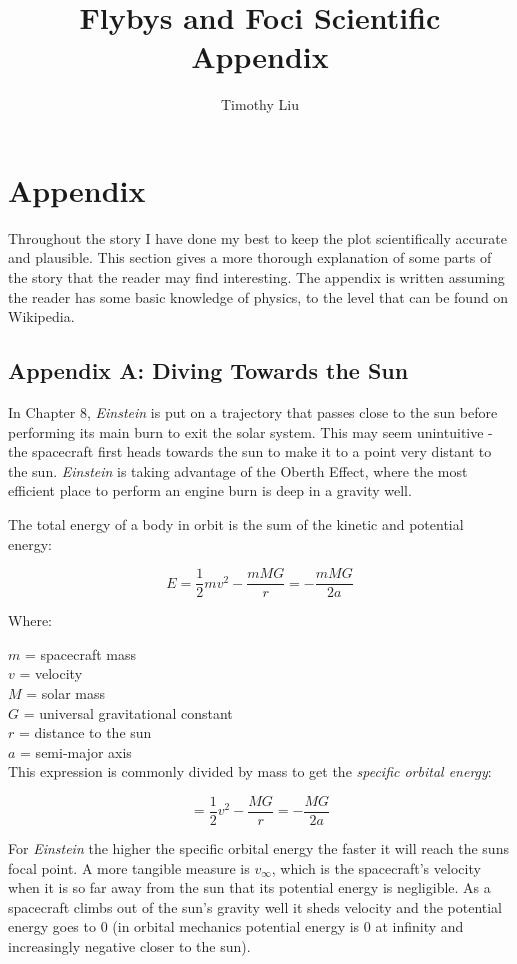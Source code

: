 \documentclass[12pt]{article} %
\title{Flybys and Foci Scientific Appendix}
\author{Timothy Liu}
\begin{document}
\maketitle

\section{Appendix}
Throughout the story I have done my best to keep the plot scientifically accurate and plausible. This section gives a more thorough explanation of some parts of the story that the reader may find interesting. The appendix is written assuming the reader has some basic knowledge of physics, to the level that can be found on Wikipedia.

\subsection{Appendix A: Diving Towards the Sun}


In Chapter 8, \textit{Einstein} is put on a trajectory that passes close to the sun before performing its main burn to exit the solar system. This may seem unintuitive - the spacecraft first heads towards the sun to make it to a point very distant to the sun. \textit{Einstein} is taking advantage of the Oberth Effect, where the most efficient place to perform an engine burn is deep in a gravity well.

The total energy of a body in orbit is the sum of the kinetic and potential energy:

$$ E = \frac{1}{2} mv^2 - \frac{mMG}{r} = -\frac{mMG}{2a}$$

Where:

$m$ = spacecraft mass \\
$v$ = velocity \\
$M$ = solar mass\\
$G$ = universal gravitational constant\\
$r$ = distance to the sun\\
$a$ = semi-major axis\\

This expression is commonly divided by mass to get the \textit{specific orbital energy}:

$$ = \frac{1}{2} v^2 - \frac{MG}{r} = -\frac{MG}{2a}$$

For \textit{Einstein} the higher the specific orbital energy the faster it will reach the suns focal point. A more tangible measure is $v_{\infty}$, which is the spacecraft's velocity when it is so far away from the sun that its potential energy is negligible. As a spacecraft climbs out of the sun's gravity well it sheds velocity and the potential energy goes to 0 (in orbital mechanics potential energy is 0 at infinity and increasingly negative closer to the sun).
\end{document}
